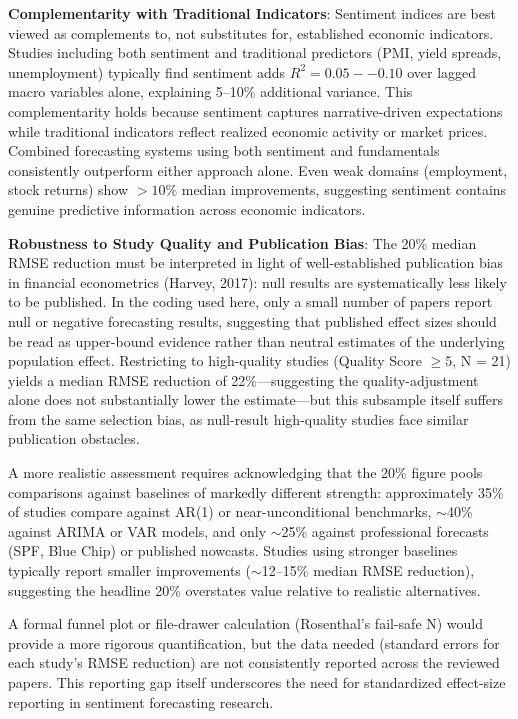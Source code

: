 \documentclass[11pt,twocolumn]{article}
\begin{document}
\textbf{Complementarity with Traditional Indicators}: Sentiment indices are best viewed as complements to, not substitutes for, established economic indicators. Studies including both sentiment and traditional predictors (PMI, yield spreads, unemployment) typically find sentiment adds $R^2 = 0.05--0.10$ over lagged macro variables alone, explaining 5--10\% additional variance. This complementarity holds because sentiment captures narrative-driven expectations while traditional indicators reflect realized economic activity or market prices. Combined forecasting systems using both sentiment and fundamentals consistently outperform either approach alone. Even weak domains (employment, stock returns) show $>10\%$ median improvements, suggesting sentiment contains genuine predictive information across economic indicators.

\textbf{Robustness to Study Quality and Publication Bias}: The 20\% median RMSE reduction must be interpreted in light of well-established publication bias in financial econometrics (Harvey, 2017): null results are systematically less likely to be published. In the coding used here, only a small number of papers report null or negative forecasting results, suggesting that published effect sizes should be read as upper-bound evidence rather than neutral estimates of the underlying population effect. Restricting to high-quality studies (Quality Score $\geq 5$, N = 21) yields a median RMSE reduction of 22\%---suggesting the quality-adjustment alone does not substantially lower the estimate---but this subsample itself suffers from the same selection bias, as null-result high-quality studies face similar publication obstacles.

A more realistic assessment requires acknowledging that the 20\% figure pools comparisons against baselines of markedly different strength: approximately 35\% of studies compare against AR(1) or near-unconditional benchmarks, $\sim$40\% against ARIMA or VAR models, and only $\sim$25\% against professional forecasts (SPF, Blue Chip) or published nowcasts. Studies using stronger baselines typically report smaller improvements ($\sim$12--15\% median RMSE reduction), suggesting the headline 20\% overstates value relative to realistic alternatives.

A formal funnel plot or file-drawer calculation (Rosenthal's fail-safe N) would provide a more rigorous quantification, but the data needed (standard errors for each study's RMSE reduction) are not consistently reported across the reviewed papers. This reporting gap itself underscores the need for standardized effect-size reporting in sentiment forecasting research.
\end{document}
